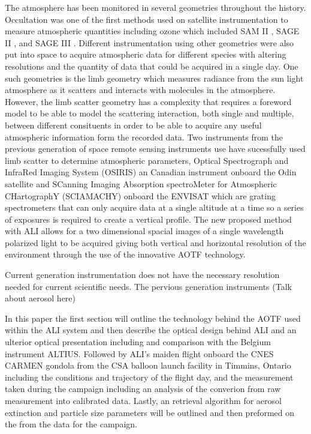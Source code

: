 \documentclass[12pt]{article}
\begin{document}
The atmosphere has been monitored in several geometries throughout the history. Occultation was one of the first methods used on satellite instrumentation to measure atmospheric quantities including ozone which included SAM II \citep{McCormick1979}, SAGE II \citep{McCormick1987}, and SAGE III \citep{Thomason2003}. Different instrumentation using other geometries were also put into space to acquire atmospheric data for different species with altering resolutions and the quantity of data that could be acquired in a single day. One such geometries is the limb geometry which measures radiance from the sun light atmosphere as it scatters and interacts with molecules in the atmosphere. However, the limb scatter geometry has a complexity that requires a foreword model to be able to model the scattering interaction, both single and multiple, between different consituents in order to be able to acquire any useful atmospheric information form the recorded data. Two instruments from the previous generation of space remote sensing instruments use have sucessfully used limb scatter to determine atmospheric parameters, Optical Spectrograph and InfraRed Imaging System (OSIRIS) an Canadian instrument onboard the Odin satellite \citep{Llewellyn2004} and SCanning Imaging Absorption spectroMeter for Atmospheric CHartographY (SCIAMACHY) onboard the ENVISAT \citep{Bovensmann1999} which are grating spectrometers that can only acquire data at a single altitude at a time so a series of exposures is required to create a vertical profile. The new proposed method with ALI allows for a two dimensional spacial images of a single wavelength polarized light to be acquired giving both vertical and horizontal resolution of the environment through the use of the innovative AOTF technology.

Current generation instrumentation does not have the necessary resolution needed for current scientific needs. The pervious generation instruments (Talk about aerosol here)

In this paper the first section will outline the technology behind the AOTF used within the ALI system and then describe the optical design behind ALI and an ulterior optical presentation including and comparison with the Belgium instrument ALTIUS. Followed by ALI's maiden flight onboard the CNES CARMEN gondola from the CSA balloon launch facility in Timmins, Ontario including the conditions and trajectory of the flight day, and the measurement taken during the campaign including an analysis of the converion from raw measurement into calibrated data. Lastly, an retrieval algorithm for aerosol extinction and particle size parameters will be outlined and then preformed on the from the data for the campaign. 
\end{document}
